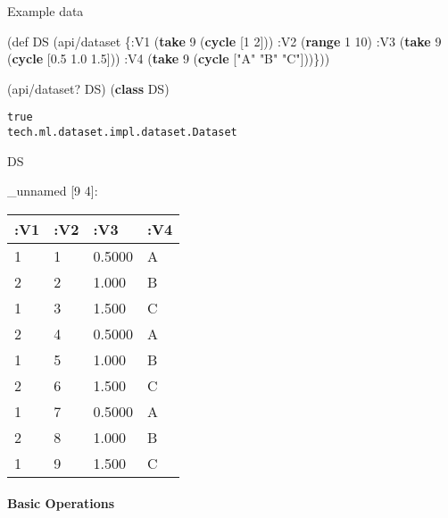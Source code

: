 \documentclass[]{article}
\newenvironment{Shaded}{\begin{snugshade}}{\end{snugshade}}
\newcommand{\KeywordTok}[1]{\textcolor[rgb]{0.13,0.29,0.53}{\textbf{#1}}}
\newcommand{\DecValTok}[1]{\textcolor[rgb]{0.00,0.00,0.81}{#1}}
\newcommand{\FloatTok}[1]{\textcolor[rgb]{0.00,0.00,0.81}{#1}}
\newcommand{\StringTok}[1]{\textcolor[rgb]{0.31,0.60,0.02}{#1}}
\newcommand{\FunctionTok}[1]{\textcolor[rgb]{0.00,0.00,0.00}{#1}}
\newcommand{\BuiltInTok}[1]{#1}
\newcommand{\AttributeTok}[1]{\textcolor[rgb]{0.77,0.63,0.00}{#1}}
\newcommand{\NormalTok}[1]{#1}
\let\oldparagraph\paragraph
\renewcommand{\paragraph}[1]{\oldparagraph{#1}\mbox{}}
\begin{document}
Example data

\begin{Shaded}
\begin{Highlighting}[]
\NormalTok{(}\BuiltInTok{def}\FunctionTok{ DS }\NormalTok{(api/dataset \{}\AttributeTok{:V1}\NormalTok{ (}\KeywordTok{take} \DecValTok{9}\NormalTok{ (}\KeywordTok{cycle}\NormalTok{ [}\DecValTok{1} \DecValTok{2}\NormalTok{]))}
                      \AttributeTok{:V2}\NormalTok{ (}\KeywordTok{range} \DecValTok{1} \DecValTok{10}\NormalTok{)}
                      \AttributeTok{:V3}\NormalTok{ (}\KeywordTok{take} \DecValTok{9}\NormalTok{ (}\KeywordTok{cycle}\NormalTok{ [}\FloatTok{0.5} \FloatTok{1.0} \FloatTok{1.5}\NormalTok{]))}
                      \AttributeTok{:V4}\NormalTok{ (}\KeywordTok{take} \DecValTok{9}\NormalTok{ (}\KeywordTok{cycle}\NormalTok{ [}\StringTok{"A"} \StringTok{"B"} \StringTok{"C"}\NormalTok{]))\}))}
\end{Highlighting}
\end{Shaded}

\begin{Shaded}
\begin{Highlighting}[]
\NormalTok{(api/dataset? DS)}
\NormalTok{(}\KeywordTok{class}\NormalTok{ DS)}
\end{Highlighting}
\end{Shaded}

\begin{verbatim}
true
tech.ml.dataset.impl.dataset.Dataset
\end{verbatim}

\begin{Shaded}
\begin{Highlighting}[]
\NormalTok{DS}
\end{Highlighting}
\end{Shaded}

\_unnamed {[}9 4{]}:

\begin{longtable}[]{@{}llll@{}}
\toprule
:V1 & :V2 & :V3 & :V4\tabularnewline
\midrule
\endhead
1 & 1 & 0.5000 & A\tabularnewline
2 & 2 & 1.000 & B\tabularnewline
1 & 3 & 1.500 & C\tabularnewline
2 & 4 & 0.5000 & A\tabularnewline
1 & 5 & 1.000 & B\tabularnewline
2 & 6 & 1.500 & C\tabularnewline
1 & 7 & 0.5000 & A\tabularnewline
2 & 8 & 1.000 & B\tabularnewline
1 & 9 & 1.500 & C\tabularnewline
\bottomrule
\end{longtable}

\paragraph{Basic Operations}\label{basic-operations}
\end{document}
